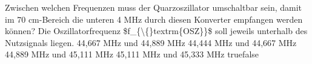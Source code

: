    {Zwischen welchen Frequenzen muss der Quarzoszillator umschaltbar sein, damit im 70 cm-Bereich die unteren 4 MHz durch diesen Konverter empfangen werden können? Die Oszillatorfrequenz \$f\_\{\textbackslash\{\}textrm\{OSZ\}\}\$ soll jeweils unterhalb des Nutzsignals liegen.}
    {44,667 MHz und 44,889 MHz}
    {44,444 MHz und 
44,667 MHz}
    {44,889 MHz und 45,111 MHz}
    {45,111 MHz und 45,333 MHz}
    {true}{false}